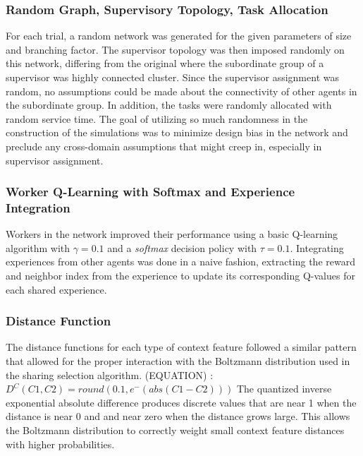 \documentclass[letterpaper]{article}
\begin{document}
\subsubsection{Random Graph, Supervisory Topology, Task Allocation}
For each trial, a random network was generated for the given parameters of size and branching factor.  The supervisor topology was then imposed randomly on this network, differing from the original where the subordinate group of a supervisor was highly connected cluster.  Since the supervisor assignment was random, no assumptions could be made about the connectivity of other agents in the subordinate group.  In addition, the tasks were randomly allocated with random service time.  The goal of utilizing so much randomness in the construction of the simulations was to minimize design bias in the network and preclude any cross-domain assumptions that might creep in, especially in supervisor assignment.

\subsubsection{Worker Q-Learning with Softmax and Experience Integration}
Workers in the network improved their performance using a basic Q-learning algorithm with $\gamma = 0.1$ and a \textit{softmax} decision policy with $\tau = 0.1$.  Integrating experiences from other agents was done in a naive fashion, extracting the reward and neighbor index from the experience to update its corresponding Q-values for each shared experience.

\subsubsection{Distance Function}
The distance functions for each type of context feature followed a similar pattern that allowed for the proper interaction with the Boltzmann distribution used in the sharing selection algorithm.
(EQUATION)  :  $D^C(C1, C2) = round(0.1, e^-(abs(C1 - C2)))$
The quantized inverse exponential absolute difference produces discrete values that are near 1 when the distance is near 0 and and near zero when the distance grows large.  This allows the Boltzmann distribution to correctly weight small context feature distances with higher probabilities.
\end{document}
